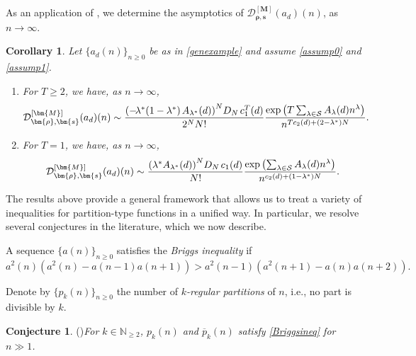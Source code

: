 \documentclass[11pt,reqno,a4paper]{amsart}
\renewcommand{\l}{\lambda}
\renewcommand{\(}{\left\(}
\renewcommand{\)}{\right\)}
\numberwithin{equation}{section}
\theoremstyle{plain}
\newtheorem{corollary}[theorem]{Corollary}
\theoremstyle{definition} %
\newcounter{specialstatement}
\newtheorem{conjecture}[specialstatement]{Conjecture}
\numberwithin{equation}{section}
\begin{document}
As an application of , we determine the asymptotics of $\mathcal{D}^{[\bm{M}]}_{\bm{\rho},\bm{s}}(a_d)(n)$, as $n\to \infty$. 



\begin{corollary}\label{Corgenthm}
	Let $\{a_d(n)\}_{n\ge 0}$ be as in \eqref{genexample} and assume {\rm{\ref{assump0}}} and {\rm{\ref{assump1}}}. %
	\begin{enumerate}
		\item \label{Corgenthmeqn1}	For $T\ge 2$, we have, as $n\to \infty$,
		\[
		\mathcal{D}^{[\bm{M}]}_{\bm{\rho},\bm{s}}(a_d)(n)\sim \frac{\left(-\!\l^*(1-\l^*)\hspace{0.05 cm}A_{\l^*}(d)\right)^N\! D_N\hspace{0.05 cm}c^T_1(d)}{2^N N!}\frac{\exp\left(T\sum_{\l\in \mathcal{S}}A_{\l}(d)n^{\l}\right)}{n^{Tc_2(d)+\left(2-\l^*\right)N}}.
		\]
		\item \label{Corgenthmeqn2} For $T=1$, we have, as $n\to \infty$,
		\[
		\mathcal{D}^{[\bm{M}]}_{\bm{\rho},\bm{s}}(a_d)(n)\sim \frac{\left(\l^*A_{\l^*}(d)\right)^N\! D_N\hspace{0.05 cm}c_1(d)}{N! }\frac{\exp\left(\sum_{\l\in \mathcal{S}}A_{\l}(d)n^{\l}\right)}{n^{c_2(d)+\left(1-\l^*\right)N}}.
		\]
	\end{enumerate}
\end{corollary}
The results above provide a general framework that allows us to treat a variety of inequalities for partition-type functions in a unified way. In particular, we resolve several conjectures in the literature, which we now describe.


 
A sequence $\{a(n)\}_{n\ge 0}$ satisfies the {\it Briggs inequality} if
\begin{equation}\label{Briggsineq}
a^2(n)\left(a^2(n)-a(n-1)a(n+1)\right)> a^2(n-1)\left(a^2(n+1)-a(n)a(n+2)\right).
\end{equation}


Denote by $\{p_k(n)\}_{n\ge 0}$ the number of {\it $k$-regular partitions} of $n$, i.e., no part is divisible by $k$. %

\begin{conjecture}{\rm{(\cite[Conjecture 3.11]{LZ})}}\label{LZconj}
{\it  For $k\in \mathbb{N}_{\ge 2}$, $p_k(n)$ and $\overline{p}_k(n)$ satisfy \eqref{Briggsineq} for $n\!\gg\!1$.}
\end{conjecture} 
\end{document}
